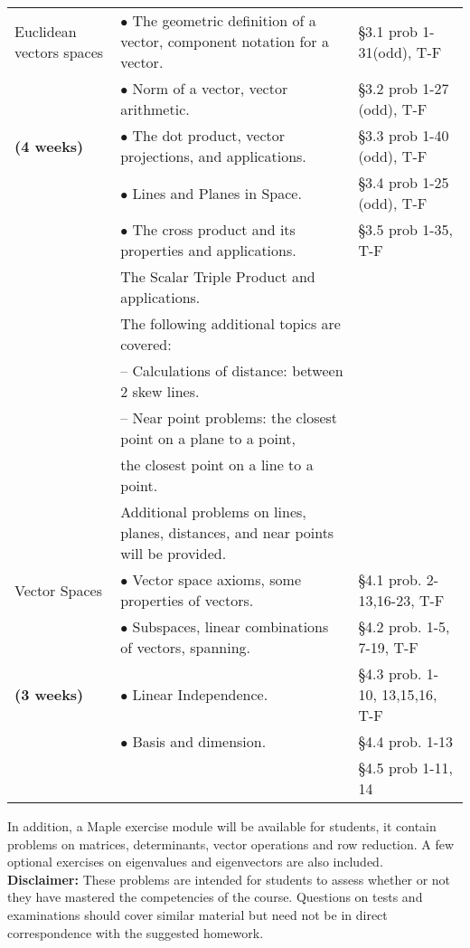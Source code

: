 {\begin{landscape}
\begin{longtable}[t]{||p{1.75in}|p{4.5in}|p{3.75in}||}
Euclidean vectors spaces
	& $\bullet$ The geometric definition of a vector, component notation for a vector.
	& \S 3.1 prob 1-31(odd), T-F
\\
	& $\bullet$ Norm of a vector, vector arithmetic.
	& \S 3.2 prob 1-27 (odd), T-F
\\ \textbf{(4 weeks)}
	& $\bullet$ The dot product, vector projections, and applications.
	& \S 3.3 prob 1-40 (odd), T-F
\\
	& $\bullet$ Lines and Planes in Space.
	& \S 3.4 prob 1-25 (odd), T-F
\\
	& $\bullet$ The cross product and its properties and applications.
	& \S 3.5 prob 1-35, T-F
\\
	& The Scalar Triple Product and applications.
	&
\\
	& The following additional topics are covered:
	&
\\
	& \hspace{0.1in} -- Calculations of distance: between 2 skew lines.
	&
\\
	& \hspace{0.1in} -- Near point problems: the closest point on a plane to a point,
	&
\\
	& \hspace{0.1in} \phantom{--} the closest point on a line to a point.
	&
\\
	& Additional problems on lines, planes, distances, and near points will be provided.
	&
\\ \hline

Vector Spaces
	& $\bullet$ Vector space axioms, some properties of vectors.
	& \S 4.1 prob. 2-13,16-23, T-F
\\
	& $\bullet$ Subspaces, linear combinations of vectors, spanning.
	& \S 4.2 prob. 1-5, 7-19, T-F
\\ \textbf{(3 weeks)}
	& $\bullet$ Linear Independence.
	& \S 4.3 prob. 1-10, 13,15,16, T-F
\\
	& $\bullet$ Basis and dimension.
	& \S 4.4 prob. 1-13
\\
	&
	& \S 4.5 prob 1-11, 14
\\

\hline
\end{longtable}
In addition, a Maple exercise module will be available for students, it contain problems on matrices, determinants, vector operations and row reduction. A few optional exercises on eigenvalues and eigenvectors are also included.\\

\noindent \textbf{Disclaimer:}  These problems are intended for students to assess whether or not they have mastered the competencies of the course.  Questions on tests and examinations should cover similar material but need not be in direct correspondence with the suggested homework.
\end{landscape}

\newpage
\vspace*{\fill}
}
